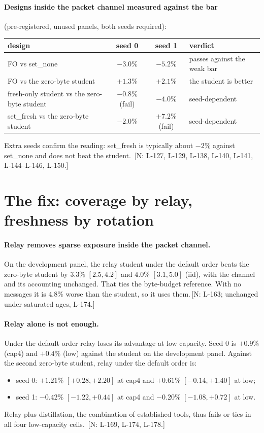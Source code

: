 \documentclass[11pt]{article}
\theoremstyle{definition}
\newif\ifshownotes\shownotestrue
\newcommand{\NOTE}[1]{\ifshownotes{\color{notecol}\,\textsf{\footnotesize[N: #1]}}\fi}
\begin{document}
\paragraph{Designs inside the packet channel measured against the bar} (pre-registered, unused panels, both seeds
required):
\begin{center}\small
\begin{tabular}{@{}lccl@{}}
\toprule
design & seed 0 & seed 1 & verdict\\
\midrule
FO vs set\_none & $-3.0\%$ & $-5.2\%$ & passes against the weak bar\\
FO vs the zero-byte student & $+1.3\%$ & $+2.1\%$ & the student is better\\
fresh-only student vs the zero-byte student & $-0.8\%$ (fail) & $-4.0\%$ & seed-dependent\\
set\_fresh vs the zero-byte student & $-2.0\%$ & $+7.2\%$ (fail) & seed-dependent\\
\bottomrule
\end{tabular}
\end{center}
Extra seeds confirm the reading: set\_fresh is typically about $-2\%$ against set\_none and does not beat the student.
\NOTE{L-127, L-129, L-138, L-140, L-141, L-144--L-146, L-150.}

\section{The fix: coverage by relay, freshness by rotation}\label{sec:fix}
\paragraph{Relay removes sparse exposure inside the packet channel.} On the development panel, the relay student under
the default order beats the zero-byte student by $3.3\%$ $[2.5,4.2]$ and $4.0\%$ $[3.1,5.0]$ (iid), with the channel and
its accounting unchanged. That ties the byte-budget reference. With no messages it is $4.8\%$ worse than the student, so
it uses them.\NOTE{L-163; unchanged under saturated ages, L-174.}
\paragraph{Relay alone is not enough.} Under the default order relay loses its advantage at low capacity. Seed 0 is
$+0.9\%$ (cap4) and $+0.4\%$ (low) against the student on the development panel. Against the second zero-byte student,
relay under the default order is:
\begin{itemize}
\item seed 0: $+1.21\%$ $[+0.28,+2.20]$ at cap4 and $+0.61\%$ $[-0.14,+1.40]$ at low;
\item seed 1: $-0.42\%$ $[-1.22,+0.44]$ at cap4 and $-0.20\%$ $[-1.08,+0.72]$ at low.
\end{itemize}
Relay plus distillation, the combination of established tools, thus fails or ties in all four low-capacity cells.
\NOTE{L-169, L-174, L-178.}
\end{document}
